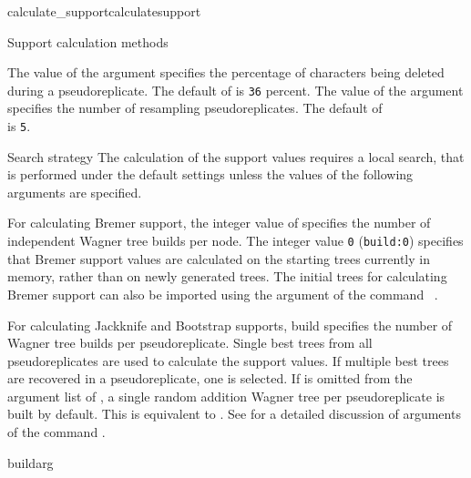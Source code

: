 \begin{command}{calculate\_support}{calculatesupport}
\begin{arguments}
\begin{argumentgroup}{Support calculation methods}
              	        
                \begin{description}
                        {The value of the argument  specifies the
                        percentage of characters being deleted during a pseudoreplicate. The
                        default of  is \texttt{36} percent.}
                        {}
                        {The value of the argument  specifies the
                        number of resampling pseudoreplicates. The default of \\
                         is \texttt{5}.}
                        {}
               \end{description}  
		\end{argumentgroup}

        \begin{argumentgroup}{Search strategy}
            {The calculation of the support values requires a local search,
            that is performed under the default settings unless the values
            of the following arguments are specified.}
		 
             {For calculating Bremer support, the integer value of
              specifies the number of independent
             Wagner tree builds per node. The integer value \texttt{0}
             (\texttt{build:0}) specifies that Bremer support values are
             calculated on the starting trees currently
             in memory, rather than on newly generated trees.
             The initial trees for calculating Bremer support
             can also be imported using the argument 
             of the command ~.
             
             For calculating Jackknife
             and Bootstrap supports, build specifies the number of
             Wagner tree builds per pseudoreplicate.  Single best trees from all
             pseudoreplicates are used to calculate the support values. If
             multiple best trees are recovered in a pseudoreplicate, one 
             is selected. If  is
             omitted from the argument list of ,
             a single random addition Wagner tree per
             pseudoreplicate is built by default. This is equivalent to 
             . See
              for a detailed discussion of
             arguments of the command .}
             {buildarg}


\end{argumentgroup}
\end{arguments}
\end{command}
